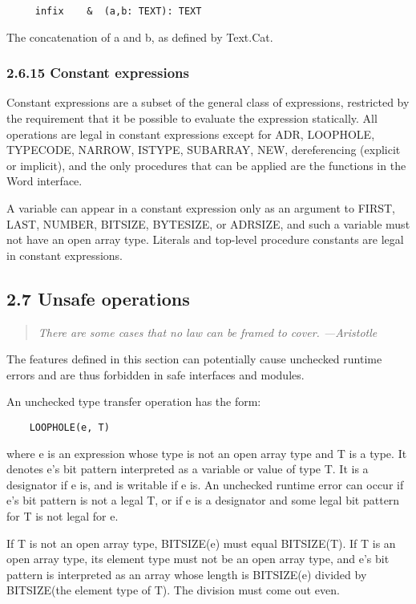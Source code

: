 \documentclass[10pt]{article}
\begin{document}
\begin{verbatim}
     infix    &  (a,b: TEXT): TEXT
\end{verbatim}
The concatenation of a and b, as defined by Text.Cat.

\subsubsection*{2.6.15 Constant expressions}

Constant expressions are a subset of the general class of expressions,
restricted by the requirement that it be possible to evaluate the expression
statically.  All operations are legal in constant expressions except for ADR,
LOOPHOLE, TYPECODE, NARROW, ISTYPE, SUBARRAY, NEW, dereferencing (explicit or
implicit), and the only procedures that can be applied are the functions in
the Word interface.

A variable can appear in a constant expression only as an argument to FIRST,
LAST, NUMBER, BITSIZE, BYTESIZE, or ADRSIZE, and such a variable must not have
an open array type.  Literals and top-level procedure constants are legal in
constant expressions.

\subsection*{2.7 Unsafe operations}

\begin{quote}
  \emph{ There are some cases that no law can be framed to cover.  ---Aristotle
  }
\end{quote}

The features defined in this section can potentially cause unchecked runtime
errors and are thus forbidden in safe interfaces and modules.

An unchecked type transfer operation has the form:
\begin{verbatim}
    LOOPHOLE(e, T)
\end{verbatim}
where e is an expression whose type is not an open array type and T is a
type.  It denotes e's bit pattern interpreted as a variable or value of type
T.  It is a designator if e is, and is writable if e is.  An unchecked runtime
error can occur if e's bit pattern is not a legal T, or if e is a designator
and some legal bit pattern for T is not legal for e.

If T is not an open array type, BITSIZE(e) must equal BITSIZE(T).  If T is an
open array type, its element type must not be an open array type, and e's bit
pattern is interpreted as an array whose length is BITSIZE(e) divided by
BITSIZE(the element type of T).  The division must come out even.
\end{document}
